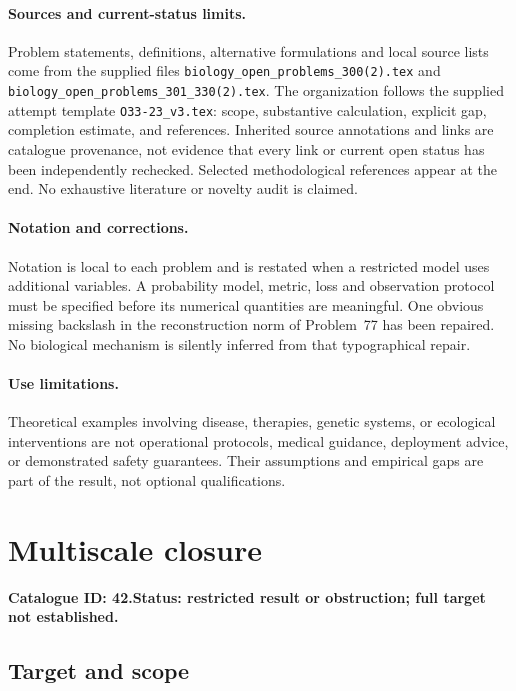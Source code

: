 \documentclass[11pt]{article}
\begin{document}
\paragraph{Sources and current-status limits.}
Problem statements, definitions, alternative formulations and local source lists
come from the supplied files
\texttt{biology\_open\_problems\_300(2).tex} and
\texttt{biology\_open\_problems\_301\_330(2).tex}.
The organization follows the supplied attempt template
\texttt{O33-23\_v3.tex}: scope, substantive calculation, explicit gap,
completion estimate, and references. Inherited source annotations and links are
catalogue provenance, not evidence that every link or current open status has
been independently rechecked. Selected methodological references appear at the
end. No exhaustive literature or novelty audit is claimed.

\paragraph{Notation and corrections.}
Notation is local to each problem and is restated when a restricted model uses
additional variables. A probability model, metric, loss and observation protocol
must be specified before its numerical quantities are meaningful. One obvious
missing backslash in the reconstruction norm of Problem~77 has been repaired.
No biological mechanism is silently inferred from that typographical repair.

\paragraph{Use limitations.}
Theoretical examples involving disease, therapies, genetic systems, or ecological
interventions are not operational protocols, medical guidance, deployment advice,
or demonstrated safety guarantees. Their assumptions and empirical gaps are part
of the result, not optional qualifications.

\setcounter{section}{41}
\section{Multiscale closure}
\label{prob:042}
\noindent\textbf{Catalogue ID: 42.}\quad \textbf{Status: restricted result or obstruction; full target not established.}
\subsection{Target and scope}
\end{document}
